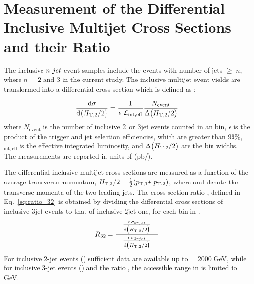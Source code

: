 \chapter{Measurement of the Differential Inclusive Multijet Cross Sections and their Ratio}
\label{chap:Measurement}
The inclusive $n\mbox{-} jet$ event samples include the events with number of jets $\geq$ $n$, where $n$ = 2 and 3 in the current study. The inclusive multijet event yields are transformed into a differential cross section which is defined as :

\begin{equation}
 \label{eq:inclusive_formula}
 {\dd{\sigma}{\big(\httwo\big)}} = \frac{1}{\epsilon~\lumi_{\mathrm{int,eff}}}\frac{N_\mathrm{event}}{\Delta\big(\httwo\big)}
\end{equation}
where $N_\mathrm{event}$ is the number of inclusive 2\hy~or 3\hy jet events counted in an \httwo bin, $\epsilon$ is the product of the trigger and jet selection efficiencies, which are greater than 99\%, \lumins$_{\mathrm{int,eff}}$ is the effective integrated luminosity, and $ \Delta\big(H_{\mathrm{T,2}}/2\big)$ are the bin widths. The measurements are reported in units of (pb/\GeV).

The differential inclusive multijet cross sections are measured as a function of the average transverse momentum, $\httwo = \frac{1}{2}(\ptone\plus \pttwo)$, where \ptone and \pttwo denote the transverse momenta of the two leading jets. The cross section ratio \ratio, defined in Eq.~\ref{eq:ratio_32} is obtained by dividing the differential cross sections of inclusive 3\hy jet events to that of inclusive 2\hy jet one, for each bin in \httwo.
\begin{equation}
 \label{eq:ratio_32}
 \ratio = \frac[10pt]{{\dd{\sigma_{3\hy jet}}{\big(\httwo\big)}}}{\dd{\sigma_{2\hy jet}}{\big(\httwo\big)}}
\end{equation}
For inclusive 2-jet events (\njt) sufficient data are available up to \httwo = 2000 GeV, while for inclusive 3-jet events (\njth) and the ratio \ratio, the accessible range in \httwo is limited to \httwo {} GeV.

